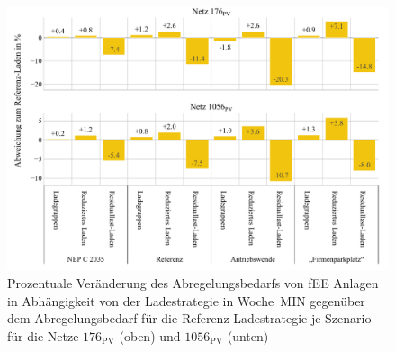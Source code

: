 \begin{figure}[H]
    \centering
    \includegraphics[width=\textwidth]{Bilder/176_1056_cur_fee_grid_week_A}
    \caption[Prozentuale Veränderung des Abregelungsbedarfs von fEE Anlagen in Abhängigkeit von der Ladestrategie in Woche~MIN gegenüber dem Abregelungsbedarf für die Referenz-Ladestrategie je Szenario für die Netze \num{176} und \num{1056}]{Prozentuale Veränderung des Abregelungsbedarfs von fEE Anlagen in Abhängigkeit von der Ladestrategie in Woche~MIN gegenüber dem Abregelungsbedarf für die Referenz-Ladestrategie je Szenario für die Netze \(176_{\text{PV}}\) (oben) und \(1056_{\text{PV}}\) (unten)}\label{fig:176_1056_cur_fee_grid_week_A}
\end{figure}